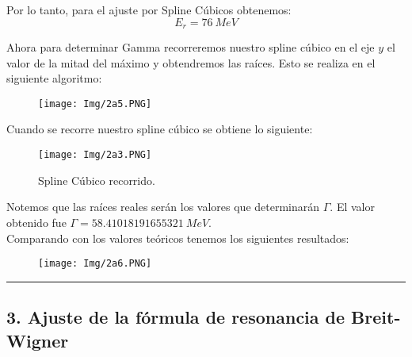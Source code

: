 \documentclass[11pt]{article}
\begin{document}
	Por lo tanto, para el ajuste por Spline Cúbicos obtenemos:
	$$E_r = \SI{76}{MeV}$$
	
	Ahora para determinar Gamma recorreremos nuestro spline cúbico en el eje $y$ el valor de la mitad del máximo y obtendremos las raíces. Esto se realiza en el siguiente algoritmo:
\newpage	
	\begin{figure}[h]
		\centering
		\texttt{[image: Img/2a5.PNG]}
	\end{figure}

	Cuando se recorre nuestro spline cúbico se obtiene lo siguiente:
	\begin{figure}[h]
		\centering
		\texttt{[image: Img/2a3.PNG]}
		\caption{Spline Cúbico recorrido.}
	\end{figure}

	Notemos que las raíces reales serán los valores que determinarán $\Gamma$. El valor obtenido fue $\Gamma = \SI{58.41018191655321}{MeV}$.\\
	Comparando con los valores teóricos tenemos los siguientes resultados:
	\begin{figure}[h]
		\centering
		\texttt{[image: Img/2a6.PNG]}
	\end{figure}
\hrule

\subsection*{\textbf{3. Ajuste de la fórmula de resonancia de Breit-Wigner}}
\end{document}
